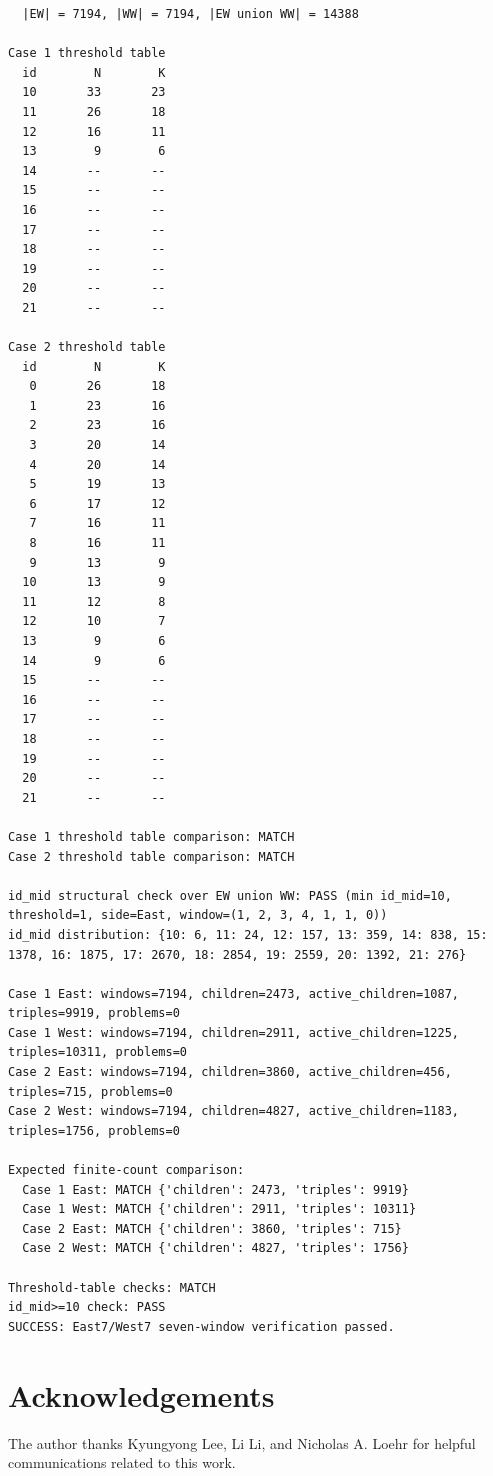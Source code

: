 \documentclass[11pt]{article}
\theoremstyle{plain}
\theoremstyle{definition}
\theoremstyle{remark}
\begin{document}
\begin{lstlisting}
  |EW| = 7194, |WW| = 7194, |EW union WW| = 14388

Case 1 threshold table
  id        N        K
  10       33       23
  11       26       18
  12       16       11
  13        9        6
  14       --       --
  15       --       --
  16       --       --
  17       --       --
  18       --       --
  19       --       --
  20       --       --
  21       --       --

Case 2 threshold table
  id        N        K
   0       26       18
   1       23       16
   2       23       16
   3       20       14
   4       20       14
   5       19       13
   6       17       12
   7       16       11
   8       16       11
   9       13        9
  10       13        9
  11       12        8
  12       10        7
  13        9        6
  14        9        6
  15       --       --
  16       --       --
  17       --       --
  18       --       --
  19       --       --
  20       --       --
  21       --       --

Case 1 threshold table comparison: MATCH
Case 2 threshold table comparison: MATCH

id_mid structural check over EW union WW: PASS (min id_mid=10, threshold=1, side=East, window=(1, 2, 3, 4, 1, 1, 0))
id_mid distribution: {10: 6, 11: 24, 12: 157, 13: 359, 14: 838, 15: 1378, 16: 1875, 17: 2670, 18: 2854, 19: 2559, 20: 1392, 21: 276}

Case 1 East: windows=7194, children=2473, active_children=1087, triples=9919, problems=0
Case 1 West: windows=7194, children=2911, active_children=1225, triples=10311, problems=0
Case 2 East: windows=7194, children=3860, active_children=456, triples=715, problems=0
Case 2 West: windows=7194, children=4827, active_children=1183, triples=1756, problems=0

Expected finite-count comparison:
  Case 1 East: MATCH {'children': 2473, 'triples': 9919}
  Case 1 West: MATCH {'children': 2911, 'triples': 10311}
  Case 2 East: MATCH {'children': 3860, 'triples': 715}
  Case 2 West: MATCH {'children': 4827, 'triples': 1756}

Threshold-table checks: MATCH
id_mid>=10 check: PASS
SUCCESS: East7/West7 seven-window verification passed.
\end{lstlisting}




\section*{Acknowledgements}
The author thanks Kyungyong Lee, Li Li, and Nicholas A. Loehr for helpful
communications related to this work.
\end{document}
